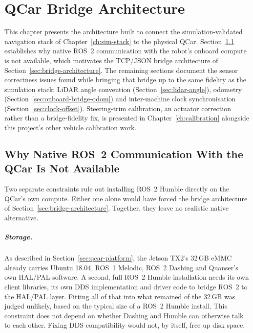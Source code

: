 \chapter{QCar Bridge Architecture}
\label{ch:hardware-bridge}

This chapter presents the architecture built to connect the
simulation-validated navigation stack of Chapter~\ref{ch:sim-stack}
to the physical QCar. Section~\ref{sec:rmw-incompatibility}
establishes why native ROS~2 communication with the robot's onboard
compute is not available, which motivates the TCP/JSON bridge
architecture of Section~\ref{sec:bridge-architecture}. The remaining
sections document the sensor correctness issues found
while bringing that bridge up to the same fidelity as the simulation
stack: LiDAR angle convention (Section~\ref{sec:lidar-angle}),
odometry (Section~\ref{sec:onboard-bridge-odom}) and inter-machine clock
synchronisation (Section~\ref{sec:clock-offset}). Steering-trim
calibration, an actuator correction rather than a bridge-fidelity
fix, is presented in Chapter~\ref{ch:calibration} alongside this
project's other vehicle calibration work.

\section{Why Native ROS~2 Communication With the QCar Is Not Available}
\label{sec:rmw-incompatibility}

Two separate constraints rule out installing ROS~2 Humble directly
on the QCar's own compute. Either one alone would have forced the
bridge architecture of Section~\ref{sec:bridge-architecture}.
Together, they leave no realistic native alternative.

\paragraph{Storage.}
As described in Section~\ref{sec:qcar-platform}, the Jetson TX2's
32\,GB eMMC \cite{quanser2023qcar} already carries Ubuntu 18.04, ROS~1 Melodic, ROS~2
Dashing and Quanser's own HAL/PAL software. A second, full ROS~2
Humble installation needs its own client libraries, its own DDS
implementation and driver code to bridge ROS~2 to the HAL/PAL
layer. Fitting all of that into what remained of the 32\,GB was
judged unlikely, based on the typical size of a ROS~2 Humble
install. This constraint does not depend on whether Dashing and
Humble can otherwise talk to each other. Fixing DDS compatibility
would not, by itself, free up disk space.

